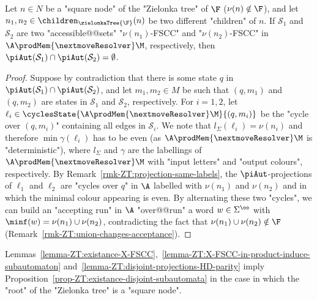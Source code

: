 \documentclass[10pt,a4paper]{amsart}
\renewcommand{\S}{\mathcal{S}}
\renewcommand{\gg}{\gamma}
\renewcommand{\SS}{\Sigma}
\begin{document}
\begin{lemma}\label{lemma-ZT:disjoint-projections-HD-parity}
	Let $n\in N$ be a "square node" of the "Zielonka tree" of $\F$ ($\nu(n)\notin \F$), and let $n_1, n_2\in \children_{\zielonkaTree{\F}}(n)$ be two different "children" of $n$. If $\S_1$ and $\S_2$ are two "accessible@@sets" "$\nu(n_1)$-FSCC" and "$\nu(n_2)$-FSCC" in $\A \prodMem{\nextmoveResolver} \M$, respectively, then $\piAut(\S_1)\cap \piAut(\S_2) = \emptyset$.
\end{lemma}
\begin{proof}
	Suppose by contradiction that there is some state $q$ in $\piAut(\S_1)\cap \piAut(\S_2)$, and let $m_1, m_2\in M$ be such that $(q,m_1)$ and $(q, m_2)$ are states in $\S_1$ and $\S_2$, respectively. For $i=1,2$, let $\ell_i\in \cyclesState{\A\prodMem{\nextmoveResolver} \M}{(q,m_i)}$ be the "cycle over $(q,m_i)$" containing all edges in $\S_i$. We note that $l_\SS(\ell_i) = \nu(n_i)$ and therefore $\min \gg(\ell_i)$ has to be even (as $\A\prodMem{\nextmoveResolver} \M$ is "deterministic"), where $l_\SS$ and $\gg$ are the labellings of $\A\prodMem{\nextmoveResolver} \M$ with "input letters" and "output colours", respectively. By Remark~\ref{rmk-ZT:projection-same-labels}, the $\piAut$-projections of $\ell_1$ and $\ell_2$ are "cycles over $q$" in $\A$ labelled with $\nu(n_1)$ and $\nu(n_2)$ and in which the minimal colour appearing is even.
	By alternating these two "cycles", we can build an "accepting run" in $\A$ "over@@run" a word $w\in \SS^\oo$ with $\minf(w) = \nu(n_1)\cup \nu(n_2)$, contradicting the fact that  $\nu(n_1)\cup \nu(n_2)\notin \F$ (Remark~\ref{rmk-ZT:union-changes-acceptance}).
\end{proof}

Lemmas~\ref{lemma-ZT:existance-X-FSCC},~\ref{lemma-ZT:X-FSCC-in-product-induce-subautomaton} and~\ref{lemma-ZT:disjoint-projections-HD-parity} imply Proposition~\ref{prop-ZT:existance-disjoint-subautomata} in the case in which the "root" of the "Zielonka tree" is a "square node".
\end{document}
